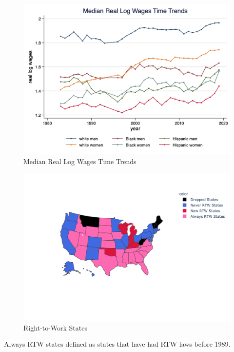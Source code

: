 \documentclass[11pt]{article}
\begin{document}
{\pagebreak
\begin{figure}[h!]
\centering
    \caption{Median Real Log Wages Time Trends}\label{fig:med_wage_time}
    \includegraphics[width=\textwidth, height = 0.8\textheight, keepaspectratio]{figures/fin_med_wage_time.png}
\end{figure}

\pagebreak
\begin{figure}[h!]
\centering
    \caption{Right-to-Work States}\label{fig:rtwmap}
    \includegraphics[width=\textwidth, height = 0.8\textheight, keepaspectratio]{figures/rtwmap.png}
\end{figure}
\footnotesize{Always RTW states defined as states that have had RTW laws before 1989.}

}
\end{document}
